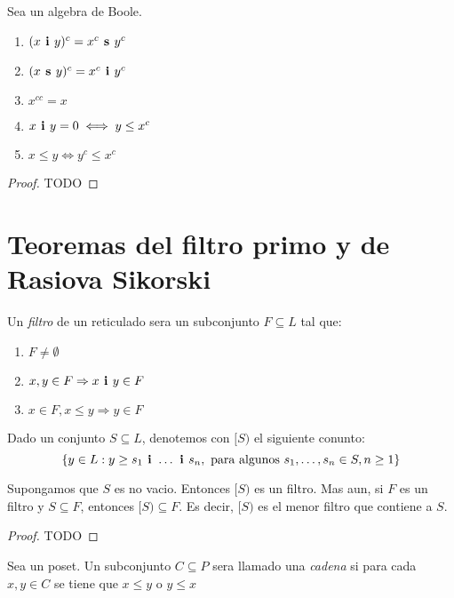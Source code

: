 \begin{theorem}
  Sea \algBoole un algebra de Boole.
  \begin{enumerate}
    \item $(\infbin{x}{y})^c = \supbin{x^c}{y^c}$
    \item $(\supbin{x}{y})^c = \infbin{x^c}{y^c}$
    \item $x^{cc} = x$
    \item $\infbin{x}{y} = 0 \iff y \leq x^c$
    \item $x\leq y \iff y^c \leq x^c$
  \end{enumerate}
\end{theorem}
\begin{proof}
  TODO
\end{proof}

\section{Teoremas del filtro primo y de Rasiova Sikorski}
\begin{definition}
  Un \emph{filtro} de un reticulado \reticulAlg sera un subconjunto $F \subseteq L$ tal que:
  \begin{enumerate}
    \item $F \neq \emptyset$
    \item $x, y \in F \Rightarrow \infbin{x}{y} \in F$
    \item $x \in F, x \leq y \Rightarrow y \in F$
  \end{enumerate}
\end{definition}

\begin{definition}
  Dado un conjunto $S \subseteq L$, denotemos con $[S)$ el siguiente conunto:
  $$
  \{y \in L : y \geq \succession[\textbf{ i }]{s}{1}{n}, \text{ para algunos } \succession{s}{1}{n} \in S, n \geq 1\}
  $$
\end{definition}
\begin{lemma}
  Supongamos que $S$ es no vacio. Entonces $[S)$ es un filtro. Mas aun, si $F$ es un filtro y $S \subseteq F$, entonces
  $[S) \subseteq F$. Es decir, $[S)$ es el menor filtro que contiene a $S$.
\end{lemma}
\begin{proof}
  TODO
\end{proof}

\begin{definition}
  Sea \poset un poset. Un subconjunto $C \subseteq P$ sera llamado una \emph{cadena} si para cada
  $x, y \in C$ se tiene que $x \leq y$ o $y \leq x$
\end{definition}

